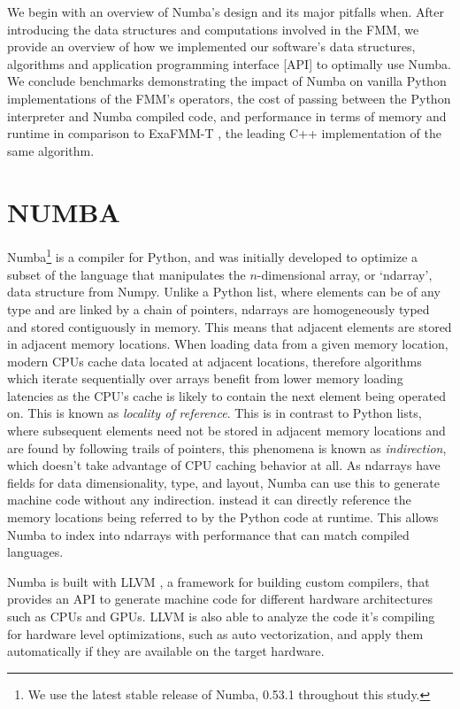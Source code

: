 \documentclass{IEEEcsmag}
\begin{document}
We begin with an overview of Numba's design and its major pitfalls when. After introducing the data structures and computations involved in the FMM, we provide an overview of how we implemented our software's data structures, algorithms and application programming interface [API] to optimally use Numba. We conclude benchmarks demonstrating the impact of Numba on vanilla Python implementations of the FMM's operators, the cost of passing between the Python interpreter and Numba compiled code, and performance in terms of memory and runtime in comparison to ExaFMM-T \cite{Wang2021}, the leading C++ implementation of the same algorithm. 

\section{NUMBA}

Numba\footnote{We use the latest stable release of Numba, 0.53.1 throughout this study.} is a compiler for Python, and was initially developed to optimize a subset of the language that manipulates the $n$-dimensional array, or `ndarray', data structure from Numpy. Unlike a Python list, where elements can be of any type and are linked by a chain of pointers, ndarrays are homogeneously typed and stored contiguously in memory. This means that adjacent elements are stored in adjacent memory locations. When loading data from a given memory location, modern CPUs cache data located at adjacent locations, therefore algorithms which iterate sequentially over arrays benefit from lower memory loading latencies as the CPU's cache is likely to contain the next element being operated on. This is known as \textit{locality of reference}. This is in contrast to Python lists, where subsequent elements need not be stored in adjacent memory locations and are found by following trails of pointers, this phenomena is known as \textit{indirection}, which doesn't take advantage of CPU caching behavior at all. As ndarrays have fields for data dimensionality, type, and layout, Numba can use this to generate machine code without any indirection. instead it can directly reference the memory locations being referred to by the Python code at runtime. This allows Numba to index into ndarrays with performance that can match compiled languages.

Numba is built with LLVM \cite{Lattner2004}, a framework for building custom compilers, that provides an API to generate machine code for different hardware architectures such as CPUs and GPUs. LLVM is also able to analyze the code it's compiling for hardware level optimizations, such as auto vectorization, and apply them automatically if they are available on the target hardware.
\end{document}
